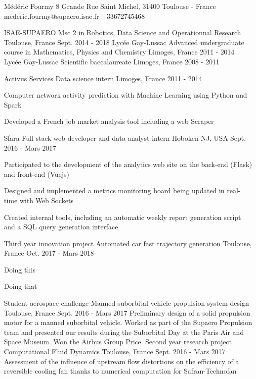 \documentclass[11pt, a4paper, final]{resume}
\begin{document}
	
	\header
		{Médéric}
		{Fourmy}
		{8 Grande Rue Saint Michel, 31400 Toulouse - France}
		{mederic.fourmy@supaero.isae.fr}
		{+33672745468}
	
	\begin{cventries}
		\cventry
		{ISAE-SUPAERO}
		{Msc 2 in Robotics, Data Science and Operationnal Research}
		{Toulouse, France}
		{Sept. 2014 - 2018}
		{}
		\cventry
		{Lycée Gay-Lussac}
		{Advanced undergraduate course in Mathematics, Physics and Chemistry}
		{Limoges, France}
		{2011 - 2014}
		{}
		\cventry
		{Lycée Gay-Lussac}
		{Scientific baccalaureate}
		{Limoges, France}
		{2008 - 2011}
		{}
	\end{cventries}
	
	\cvsection{Work experience}
	\begin{cventries}
		\cventry
		{Activus Services}
		{Data science intern}
		{Limoges, France}
		{2011 - 2014}
		{
			\begin{cvitems}{}
				\item Computer network activity prediction with Machine Learning using Python and Spark
				\item Developed a French job market analysis tool including a web Scraper
			\end{cvitems}
		}
		\cventry
		{Sfara}
		{Full stack web developer and data analyst intern}
		{Hoboken NJ, USA}
		{Sept. 2016 - Mars 2017}
		{
			\begin{cvitems}{}
				\item Participated to the development of the analytics web site on the back-end (Flask) and front-end (Vuejs)
				\item Designed and implemented a metrics monitoring board being updated in real-time with Web Sockets
				\item Created internal tools, including an automatic weekly report generation script and a SQL query generation interface
			\end{cvitems}
		}
	\end{cventries}
	
	
	\cvsection{Projects}
	\begin{cventries}
		\cventry
		{Third year innovation project}
		{Automated car fast trajectory generation}
		{Toulouse, France}
		{Oct. 2017 - Mars 2018}
		{
			\begin{cvitems}{}
				\item Doing this
				\item Doing that
			\end{cvitems}
		}
		\cventry
		{Student aerospace challenge}
		{Manned suborbital vehicle propulsion system design}
		{Toulouse, France}
		{Sept. 2016 - Mars 2017}
		{
			Preliminary design of a solid propulsion motor for a manned suborbital vehicle. Worked as part of the Supaero Propulsion team and presented our 
			results during the Suborbital Day at the Paris Air and Space Museum. Won the Airbus Group Price.
		}
		\cventry
		{Second year research project}
		{Computational Fluid Dynamics}
		{Toulouse, France}
		{Sept. 2016 - Mars 2017}
		{
			Assessment of the influence of upstream flow distortions on the efficiency of a
			reversible cooling fan thanks to numerical computation for Safran-Technofan
		}
	\end{cventries}
	
\end{document}
